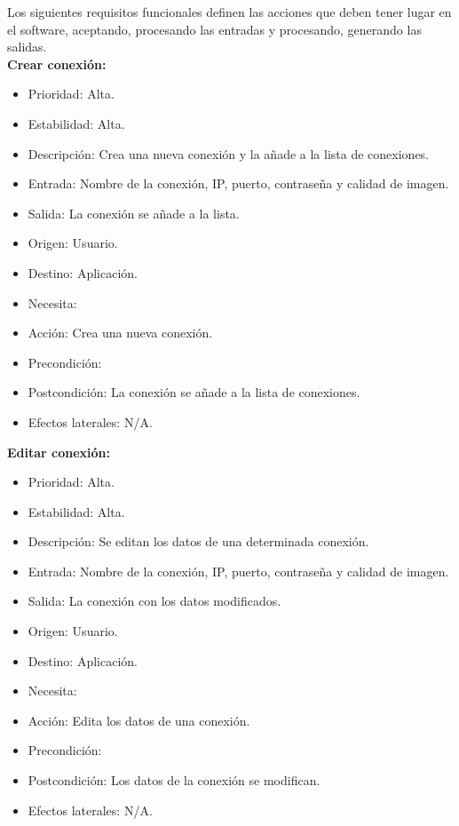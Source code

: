 Los siguientes requisitos funcionales definen las acciones que deben tener lugar en el software, aceptando, procesando las entradas y procesando, generando las salidas.\\

\textbf{Crear conexión:}
\begin{itemize}
\item Prioridad: Alta.
\item Estabilidad: Alta.
\item Descripción: Crea una nueva conexión y la añade a la lista de conexiones.
\item Entrada: Nombre de la conexión, IP, puerto, contraseña y calidad de imagen.
\item Salida: La conexión se añade a la lista.
\item Origen: Usuario.
\item Destino: Aplicación.
\item Necesita:
\item Acción: Crea una nueva conexión.
\item Precondición:
\item Postcondición: La conexión se añade a la lista de conexiones.
\item Efectos laterales: N/A.\\

\end{itemize}

\textbf{Editar conexión:}
\begin{itemize}
\item Prioridad: Alta.
\item Estabilidad: Alta.
\item Descripción: Se editan los datos de una determinada conexión.
\item Entrada: Nombre de la conexión, IP, puerto, contraseña y calidad de imagen.
\item Salida: La conexión con los datos modificados.
\item Origen: Usuario.
\item Destino: Aplicación.
\item Necesita:
\item Acción: Edita los datos de una conexión.
\item Precondición:
\item Postcondición: Los datos de la conexión se modifican.
\item Efectos laterales: N/A.\\

\end{itemize}

